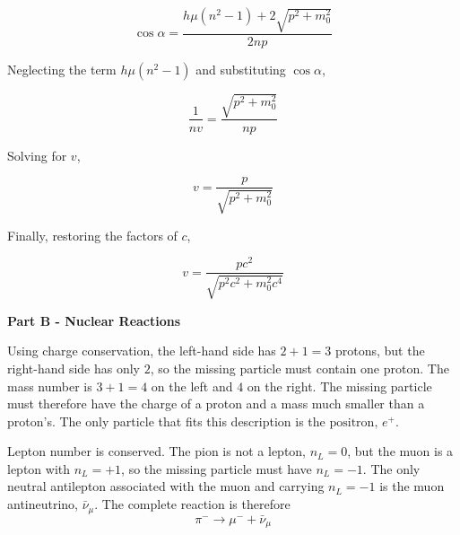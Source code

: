 \documentclass[11pt]{article}
\begin{document}
\begin{pproblem}
\begin{pssolution*}{}{}
\begin{alternativas}
        \[\cos\alpha = \frac{h\mu(n^2-1)+2\sqrt{p^2+m_0^2}}{2np}\]

        Neglecting the term \(h\mu(n^2-1)\) and substituting \(\cos\alpha\),

        \[\frac{1}{nv} = \frac{\sqrt{p^2+m_0^2}}{np}\]

        Solving for \(v\),

        \[v = \frac{p}{\sqrt{p^2+m_0^2}}\]

        Finally, restoring the factors of \(c\),

        \[\boxed{v = \frac{pc^2}{\sqrt{p^2c^2+m_0^2c^4}}}\]

        \begin{center}
            \textbf{Part B - Nuclear Reactions}    
        \end{center}

        \item Using charge conservation, the left-hand side has \(2+1=3\) protons, but the right-hand side has only \(2\), so the missing particle must contain one proton. The mass number is \(3+1=4\) on the left and \(4\) on the right. The missing particle must therefore have the charge of a proton and a mass much smaller than a proton's. The only particle that fits this description is the \(\boxed{\text{positron, }e^+}\).
            
        \item Lepton number is conserved. The pion is not a lepton, \(n_L=0\), but the muon is a lepton with \(n_L=+1\), so the missing particle must have \(n_L=-1\). The only neutral antilepton associated with the muon and carrying \(n_L=-1\) is the muon antineutrino, \(\bar{\nu}_\mu\). The complete reaction is therefore
        \[\boxed{\pi^{-}\rightarrow \mu^- + \bar{\nu}_\mu}{}\]

    \end{alternativas}

\end{pssolution*}
\end{pproblem}
\end{document}
